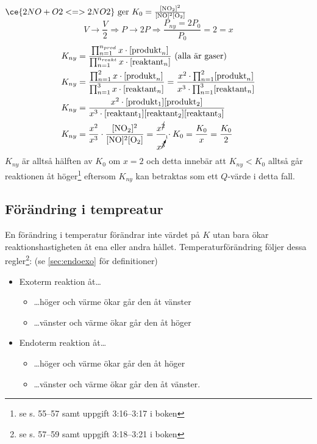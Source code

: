 \begin{exm}
    $\ce{2NO + O2 <=> 2NO2} \mathrm{\ ger \ } K_0=\frac{\mathrm{[NO_2]^2}}{\mathrm{[NO]^2[O_2]}}$
    \begin{equation*}
        V \rightarrow \frac{V}{2} \Rightarrow P \rightarrow 2P \Rightarrow \frac{P_{ny}=2P_0}{P_0} = 2 = x
    \end{equation*}
    \begin{align*}
        K_{ny} &= \frac{\prod^{n_{prod}}_{n=1} x \cdot [\mathrm{produkt}_n]}{\prod^{n_{reakt}}_{n=1} x \cdot [\mathrm{reaktant}_n]} \text{ (alla är gaser)} \\
        K_{ny} &= \frac{\prod^{2}_{n=1} x \cdot [\mathrm{produkt}_n]}{\prod^{3}_{n=1} x \cdot [\mathrm{reaktant}_n]} = \frac{x^2 \cdot \prod^{2}_{n=1} [\mathrm{produkt}_n]}{x^3 \cdot \prod^{3}_{n=1} [\mathrm{reaktant}_n]} \\
        K_{ny} &= \frac{x^2 \cdot \mathrm{[produkt_1][produkt_2]}}{x^3 \cdot \mathrm{[reaktant_1][reaktant_2][reaktant_3]}} \\
        K_{ny} &= \frac{x^2}{x^3} \cdot \frac{\mathrm{[NO_2]^2}}{\mathrm{[NO]^2[O_2]}} = \frac{x^{\cancel{2}}}{x^{\cancelto{1}{3}}} \cdot K_0 = \frac{K_0}{x} = \frac{K_0}{2}
    \end{align*}
    $K_{ny}$ är alltså hälften av $K_0$ om $x=2$ och detta innebär att $K_{ny} < K_0$ alltså går reaktionen åt höger\footnote{se s. 55--57 samt uppgift 3:16--3:17 i boken} eftersom $K_{ny}$ kan betraktas som ett $Q$-värde i detta fall.
\end{exm}

\subsection{Förändring i tempreatur}
En förändring i temperatur förändrar inte värdet på $K$ utan bara ökar reaktionshastigheten åt ena eller andra hållet. Temperaturförändring följer dessa regler\footnote{se s. 57--59 samt uppgift 3:18--3:21 i boken}: (se \vref{sec:endoexo} för definitioner)
\begin{itemize}
    \item Exoterm reaktion åt\ldots
    \begin{itemize}
        \item \ldots höger och värme ökar går den åt vänster
        \item \ldots vänster och värme ökar går den åt höger
    \end{itemize}
    \item Endoterm reaktion åt\ldots
    \begin{itemize}
        \item \ldots höger och värme ökar går den åt höger
        \item \dots vänster och värme ökar går den åt vänster.
    \end{itemize}
\end{itemize}


